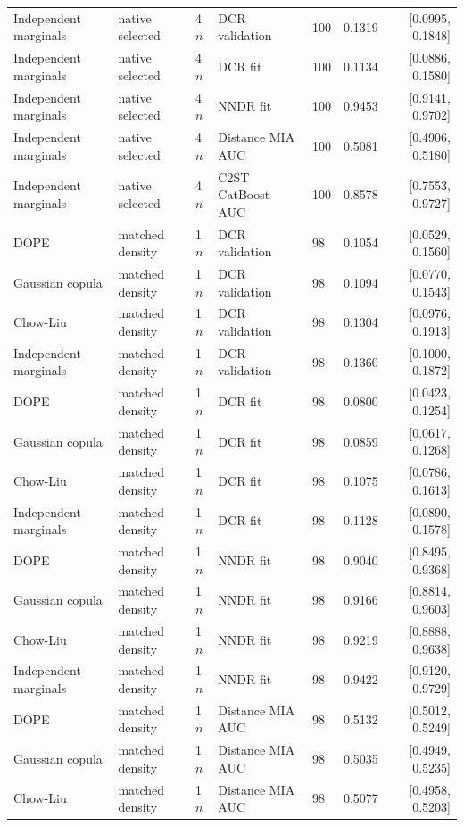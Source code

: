 \begin{longtable}{lllllrr}
Independent marginals & native selected & 4$n$ & DCR validation & 100 & 0.1319 & [0.0995, 0.1848] \\
Independent marginals & native selected & 4$n$ & DCR fit & 100 & 0.1134 & [0.0886, 0.1580] \\
Independent marginals & native selected & 4$n$ & NNDR fit & 100 & 0.9453 & [0.9141, 0.9702] \\
Independent marginals & native selected & 4$n$ & Distance MIA AUC & 100 & 0.5081 & [0.4906, 0.5180] \\
Independent marginals & native selected & 4$n$ & C2ST CatBoost AUC & 100 & 0.8578 & [0.7553, 0.9727] \\
DOPE & matched density & 1$n$ & DCR validation & 98 & 0.1054 & [0.0529, 0.1560] \\
Gaussian copula & matched density & 1$n$ & DCR validation & 98 & 0.1094 & [0.0770, 0.1543] \\
Chow-Liu & matched density & 1$n$ & DCR validation & 98 & 0.1304 & [0.0976, 0.1913] \\
Independent marginals & matched density & 1$n$ & DCR validation & 98 & 0.1360 & [0.1000, 0.1872] \\
DOPE & matched density & 1$n$ & DCR fit & 98 & 0.0800 & [0.0423, 0.1254] \\
Gaussian copula & matched density & 1$n$ & DCR fit & 98 & 0.0859 & [0.0617, 0.1268] \\
Chow-Liu & matched density & 1$n$ & DCR fit & 98 & 0.1075 & [0.0786, 0.1613] \\
Independent marginals & matched density & 1$n$ & DCR fit & 98 & 0.1128 & [0.0890, 0.1578] \\
DOPE & matched density & 1$n$ & NNDR fit & 98 & 0.9040 & [0.8495, 0.9368] \\
Gaussian copula & matched density & 1$n$ & NNDR fit & 98 & 0.9166 & [0.8814, 0.9603] \\
Chow-Liu & matched density & 1$n$ & NNDR fit & 98 & 0.9219 & [0.8888, 0.9638] \\
Independent marginals & matched density & 1$n$ & NNDR fit & 98 & 0.9422 & [0.9120, 0.9729] \\
DOPE & matched density & 1$n$ & Distance MIA AUC & 98 & 0.5132 & [0.5012, 0.5249] \\
Gaussian copula & matched density & 1$n$ & Distance MIA AUC & 98 & 0.5035 & [0.4949, 0.5235] \\
Chow-Liu & matched density & 1$n$ & Distance MIA AUC & 98 & 0.5077 & [0.4958, 0.5203] \\

\end{longtable}
